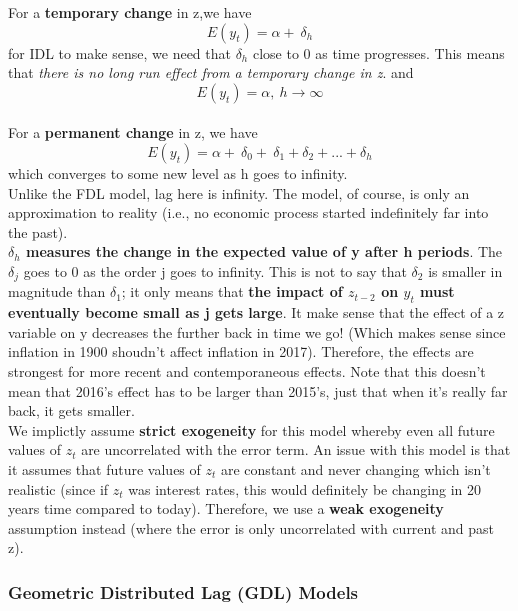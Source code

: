 \documentclass[12pt]{article}
\begin{document}
\noindent
For a \textbf{temporary change} in z,we have 
\begin{equation}
E(y_t)=\alpha +\ \delta_h 
\end{equation}
for IDL to make sense, we need that $\delta_h$ close to 0 as time progresses. This means that \textit{there is no long run effect from a temporary change in z}. and 
\begin{equation}
E(y_t)=\alpha,\  h \rightarrow\infty 
\end{equation}
\\
For a \textbf{permanent change} in z, we have 
\begin{equation}
E(y_t)=\alpha +\ \delta_0 +\ \delta_1+\delta_2 +...+\delta_h 
\end{equation}
which converges to some new level as h goes to infinity.
\\

Unlike the FDL model, lag here is infinity.
The model, of course, is only an approximation to reality (i.e., no economic process started indefinitely far into the past).
\\

\textbf{$\delta_h$ measures the change in the expected value of y after h periods}. The $\delta_j$ goes to 0 as the order j goes to infinity. This is not to say that $\delta_2$ is smaller in magnitude than $\delta_1$; it only means that \textbf{the impact of $z_{t-2}$ on $y_t$ must eventually become small as j gets large}. It make sense that the effect of a z variable on y decreases the further back in time we go! (Which makes sense since inflation in 1900 shoudn’t affect inflation in 2017). Therefore, the effects are strongest for more recent and contemporaneous effects. Note that this doesn’t mean that 2016’s effect has to be larger than 2015’s, just that when it’s really far back, it gets smaller.
\\

We implictly assume \textbf{strict exogeneity} for this model whereby even all future values of $z_t$ are uncorrelated with the error term. An issue with this model is that it assumes that future values of $z_t$ are constant and never changing which isn’t realistic (since if $z_t$ was interest rates, this would definitely be changing in 20 years time compared to today). Therefore, we use a \textbf{weak exogeneity} assumption instead (where the error is only uncorrelated with current and past z).
\\
 
{\color{RoyalBlue}
\subsubsection{Geometric Distributed Lag (GDL) Models}}
\end{document}
